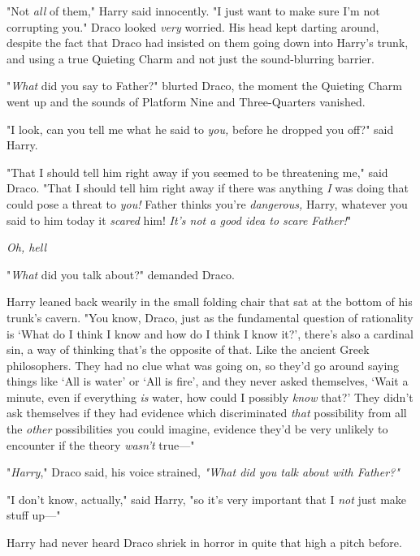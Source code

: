 "Not \emph{all} of them," Harry said innocently. "I just want to make sure I'm
not corrupting you."
\sbreak
Draco looked \emph{very} worried. His head kept darting around, despite the
fact that Draco had insisted on them going down into Harry's trunk, and using a
true Quieting Charm and not just the sound-blurring barrier.

"\emph{What} did you say to Father?" blurted Draco, the moment the Quieting
Charm went up and the sounds of Platform Nine and Three-Quarters vanished.

"I{\el} look, can you tell me what he said to \emph{you,} before he dropped
you off?" said Harry.

"That I should tell him right away if you seemed to be threatening me," said
Draco. "That I should tell him right away if there was anything \emph{I} was
doing that could pose a threat to \emph{you!} Father thinks you're
\emph{dangerous,} Harry, whatever you said to him today it \emph{scared} him!
\emph{It's not a good idea to scare Father!}"

\emph{Oh, hell{\el}}

"\emph{What} did you talk about?" demanded Draco.

Harry leaned back wearily in the small folding chair that sat at the bottom of
his trunk's cavern. "You know, Draco, just as the fundamental question of
rationality is `What do I think I know and how do I think I know it?', there's
also a cardinal sin, a way of thinking that's the opposite of that. Like the
ancient Greek philosophers. They had no clue what was going on, so they'd go
around saying things like `All is water' or `All is fire', and they never asked
themselves, `Wait a minute, even if everything \emph{is} water, how could I
possibly \emph{know} that?' They didn't ask themselves if they had evidence
which discriminated \emph{that} possibility from all the \emph{other}
possibilities you could imagine, evidence they'd be very unlikely to encounter
if the theory \emph{wasn't} true\mbox{---}"

"\emph{Harry}," Draco said, his voice strained, \emph{"What did you talk about
with Father?"}

"I don't know, actually," said Harry, "so it's very important that I \emph{not}
just make stuff up\mbox{---}"

Harry had never heard Draco shriek in horror in quite that high a pitch before.
